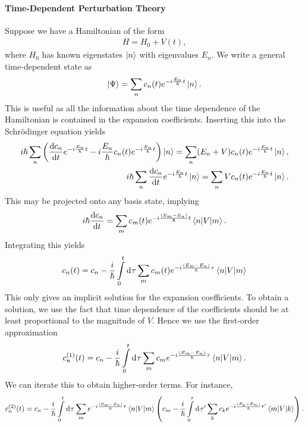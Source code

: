 \paragraph{Time-Dependent Perturbation Theory}
Suppose we have a Hamiltonian of the form
\begin{align*}
	H = H_{0} + V(t),
\end{align*}
where $H_{0}$ has known eigenstates $\ket{n}$ with eigenvalues $E_{n}$. We write a general time-dependent state as
\begin{align*}
	\ket{\Psi} = \sum\limits_{n}c_{n}(t)e^{-i\frac{E_{n}}{\hbar}t}\ket{n}.
\end{align*}
This is useful as all the information about the time dependence of the Hamiltonian is contained in the expansion coefficients. Inserting this into the Schrödinger equation yields
\begin{align*}
	i\hbar\sum\limits_{n}\left(\dv{c_{n}}{t}e^{-i\frac{E_{n}}{\hbar}t} -  i\frac{E_{n}}{\hbar}c_{n}(t)e^{-i\frac{E_{n}}{\hbar}t}\right)\ket{n} = \sum\limits_{n}(E_{n} + V)c_{n}(t)e^{-i\frac{E_{n}}{\hbar}t}\ket{n}, \\
	i\hbar\sum\limits_{n}\dv{c_{n}}{t}e^{-i\frac{E_{n}}{\hbar}t} \ket{n} = \sum\limits_{n}Vc_{n}(t)e^{-i\frac{E_{n}}{\hbar}t}\ket{n}.
\end{align*}
This may be projected onto any basis state, implying
\begin{align*}
	i\hbar\dv{c_{n}}{t} = \sum\limits_{m}c_{m}(t)e^{-i\frac{(E_{m} - E_{n})}{\hbar}t}\mel{n}{V}{m}.
\end{align*}
Integrating this yields
\begin{align*}
	c_{n}(t) = c_{n} - \frac{i}{\hbar}\int\limits_{0}^{t}\dd[]{\tau}\sum\limits_{m}c_{m}(t)e^{-i\frac{(E_{m} - E_{n})}{\hbar}\tau}\mel{n}{V}{m}
\end{align*}
This only gives an implicit solution for the expansion coefficients. To obtain a solution, we use the fact that time dependence of the coefficients should be at least proportional to the magnitude of $V$. Hence we use the first-order approximation
\begin{align*}
	c_{n}^{(1)}(t) = c_{n} - \frac{i}{\hbar}\int\limits_{0}^{t}\dd[]{\tau}\sum\limits_{m}c_{m}e^{-i\frac{(E_{m} - E_{n})}{\hbar}\tau}\mel{n}{V}{m}.
\end{align*}
We can iterate this to obtain higher-order terms. For instance,
\begin{align*}
	c_{n}^{(2)}(t) = c_{n} - \frac{i}{\hbar}\int\limits_{0}^{t}\dd[]{\tau}\sum\limits_{m}e^{-i\frac{(E_{m} - E_{n})}{\hbar}\tau}\mel{n}{V}{m}\left(c_{m} - \frac{i}{\hbar}\int\limits_{0}^{\tau}\dd[]{\tau^{\prime}}\sum\limits_{k}c_{k}e^{-i\frac{(E_{k} - E_{m})}{\hbar}\tau^{\prime}}\mel{m}{V}{k}\right).
\end{align*}

